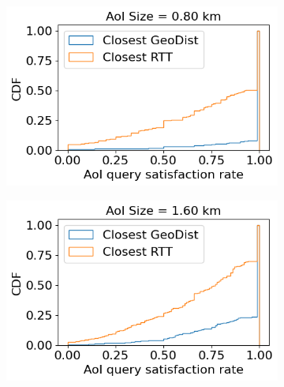 \begin{figure}
\begin{subfigure}{0.3\textwidth}
  \caption{}
\end{subfigure}
\begin{subfigure}{0.333\textwidth}
  \centering
  \includegraphics[width=\linewidth]{figures/mechanisms/spatial_ctx_mgmt/aoi_satisfaction_rate_cdf_AOI_0_800_km.png}
  \caption{}
\end{subfigure}%
\begin{subfigure}{0.333\textwidth}
  \centering
  \includegraphics[width=\linewidth]{figures/mechanisms/spatial_ctx_mgmt/aoi_satisfaction_rate_cdf_AOI_1_600_km.png}
  \caption{}
\end{subfigure}%
\begin{subfigure}{0.333\textwidth}
  \centering

\end{subfigure}
\end{figure}
